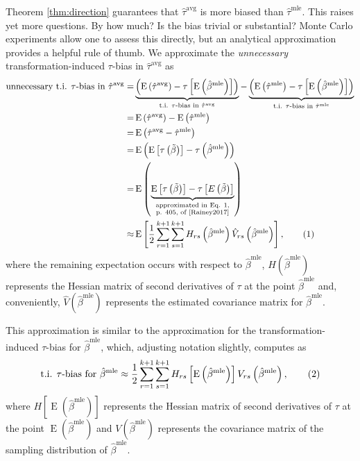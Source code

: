 \documentclass[11pt]{article}
\newcommand\numberthis{\addtocounter{equation}{1}\tag{\theequation}}
\DeclareMathOperator*{\E}{\text{E}}
\begin{document}
Theorem \ref{thm:direction} guarantees that $\hat{\tau}^\text{avg}$ is more biased than $\hat{\tau}^\text{mle}$.
This raises yet more questions.
By how much? 
Is the bias trivial or substantial? 
Monte Carlo experiments allow one to assess this directly, but an analytical approximation provides a helpful rule of thumb.
We approximate the \textit{unnecessary} transformation-induced $\tau$-bias in $\hat{\tau}^\text{avg}$ as
\begin{align*}
\text{unnecessary t.i. $\tau$-bias in } \hat{\tau}^\text{avg} =& \underbrace{\left( \E \left( \hat{\tau}^\text{avg}\right) - \tau \left[\E \left( \hat{\beta}^\text{mle} \right) \right] \right) }_{\text{t.i. } \tau\text{-bias in }\hat{\tau}^{\text{avg}}} - \underbrace{ \left( \E \left( \hat{\tau}^\text{mle}\right) -  \tau \left[\E \left( \hat{\beta}^\text{mle} \right) \right] \right)}_{\text{t.i. } \tau\text{-bias in }\hat{\tau}^{\text{mle}}}\\
=& \E \left( \hat{\tau}^\text{avg}\right) - \E \left( \hat{\tau}^\text{mle}\right)\\
=& \E \left( \hat{\tau}^\text{avg} - \hat{\tau}^\text{mle} \right)\\
=& \E \left(     \E \left[ \tau\left( \tilde{\beta} \right) \right]      -      \tau \left( \hat{\beta}^\text{mle} \right)     \right)\\
=& \E \left(     \underbrace{\E \left[ \tau\left( \tilde{\beta} \right) \right]      -      \tau \left[ E\left(  \tilde{\beta} \right)\right]}_{\substack{\text{approximated in Eq. 1,} \\ \text{p. 405, of \cite{Rainey2017}}}}   \right)\\
\approx & \E \left[ \dfrac{1}{2} \displaystyle \sum_{r = 1}^{k+1} \sum_{s = 1}^{k+1} H_{rs}\left( \hat{\beta}^\text{mle} \right) \hat{V}_{rs} \left( \hat{\beta}^{\text{mle}} \right) \right], \numberthis \label{eqn:avg-approx}
\end{align*}
where the remaining expectation occurs with respect to $\hat{\beta}^\text{mle}$, $H\left( \hat{\beta}^\text{mle} \right)$ represents the Hessian matrix of second derivatives of $\tau$ at the point $\hat{\beta}^\text{mle}$ and, conveniently, $\hat{V} \left( \hat{\beta}^{\text{mle}} \right)$ represents the estimated covariance matrix for $\hat{\beta}^\text{mle}$.

This approximation is similar to the approximation for the transformation-induced $\tau$-bias for $\hat{\beta}^\text{mle}$, which, adjusting notation slightly, \citet[p. 405, Eq. 1]{Rainey2017} computes as
\begin{align*}
\text{t.i. } \tau \text{-bias for } \hat{\beta}^\text{mle} \approx \dfrac{1}{2} \displaystyle \sum_{r = 1}^{k+1} \sum_{s = 1}^{k+1} H_{rs}\left[ \E \left( \hat{\beta}^\text{mle} \right) \right] V_{rs} \left( \hat{\beta}^{\text{mle}} \right), \numberthis \label{eqn:mle-approx}
\end{align*}
where $H\left[ \E \left( \hat{\beta}^\text{mle} \right) \right]$ represents the Hessian matrix of second derivatives of $\tau$ at the point $\E \left( \hat{\beta}^\text{mle} \right)$ and $V \left( \hat{\beta}^{\text{mle}} \right)$ represents the covariance matrix of the sampling distribution of $\hat{\beta}^\text{mle}$.
\end{document}
